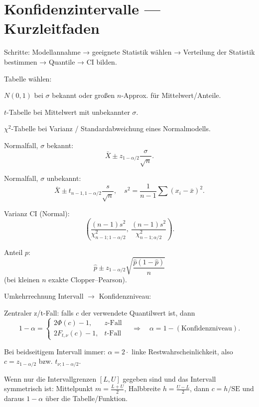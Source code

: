 \documentclass[11pt,a4paper]{article}
\begin{document}
\section*{Konfidenzintervalle — Kurzleitfaden}
\begin{compactenum}
\item Schritte: Modellannahme → geeignete Statistik wählen → Verteilung der Statistik bestimmen → Quantile → CI bilden.
\item Tabelle wählen:
\begin{compactenum}
\item $N(0,1)$ bei $\sigma$ bekannt oder großen $n$-Approx. für Mittelwert/Anteile.
\item $t$-Tabelle bei Mittelwert mit unbekannter $\sigma$.
\item $\chi^2$-Tabelle bei Varianz / Standardabweichung eines Normalmodells.
\end{compactenum}
\item Normalfall, $\sigma$ bekannt:
\[\bar X\pm z_{1-\alpha/2}\frac{\sigma}{\sqrt n}.
\]
\item Normalfall, $\sigma$ unbekannt:
\[\bar X\pm t_{n-1,1-\alpha/2}\frac{s}{\sqrt n},\quad s^2=\frac{1}{n-1}\sum (x_i-\bar x)^2.
\]
\item Varianz CI (Normal):
\[\left(\frac{(n-1)s^2}{\chi^2_{n-1;1-\alpha/2}},\ \frac{(n-1)s^2}{\chi^2_{n-1;\alpha/2}}\right).
\]
\item Anteil $p$: \[\hat p\pm z_{1-\alpha/2}\sqrt{\frac{\hat p(1-\hat p)}{n}}\] (bei kleinen $n$ exakte Clopper–Pearson).
\item Umkehrrechnung Intervall $\to$ Konfidenzniveau:
\begin{compactenum}
\item Zentraler z/t-Fall: falls $c$ der verwendete Quantilwert ist, dann
\[1-\alpha=\begin{cases}
2\Phi(c)-1,& z\text{-Fall}\\
2F_{t,\nu}(c)-1,& t\text{-Fall}
\end{cases}
\quad\Rightarrow\quad \alpha=1-(\text{Konfidenzniveau}).\]
\item Bei beidseitigem Intervall immer: $\alpha=2\cdot$ linke Restwahrscheinlichkeit, also $c=z_{1-\alpha/2}$ bzw. $t_{\nu;1-\alpha/2}$.
\item Wenn nur die Intervallgrenzen $[L,U]$ gegeben sind und das Intervall symmetrisch ist: Mittelpunkt $m=\frac{L+U}{2}$, Halbbreite $h=\frac{U-L}{2}$, dann $c=h/\mathrm{SE}$ und daraus $1-\alpha$ über die Tabelle/Funktion.
\end{compactenum}
\end{compactenum}
\end{document}
